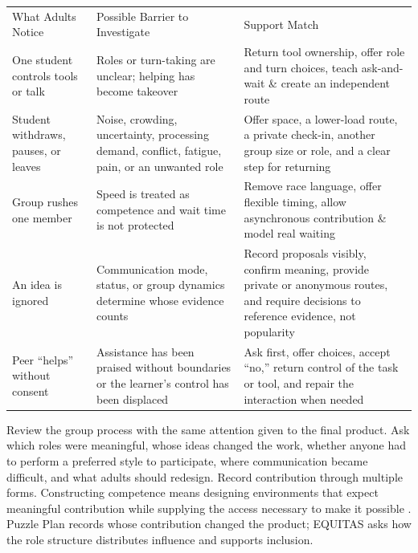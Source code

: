 \begin{tabularx}{\textwidth}{
>{\RaggedRight\arraybackslash}p{1.35in}
>{\RaggedRight\arraybackslash}p{2.25in}
>{\RaggedRight\arraybackslash}X}

\rowcolor{PrimaryRed}
\color{white}What Adults Notice &
\color{white}Possible Barrier to Investigate &
\color{white}Support Match \\

One student controls tools or talk &
Roles or turn-taking are unclear; helping has become takeover &
Return tool ownership, offer role and turn choices, teach ask-and-wait \& create an independent route \\

\rowcolor{SoftGray}
Student withdraws, pauses, or leaves &
Noise, crowding, uncertainty, processing demand, conflict, fatigue, pain, or an unwanted role &
Offer space, a lower-load route, a private check-in, another group size or role, and a clear step for returning \\

Group rushes one member &
Speed is treated as competence and wait time is not protected &
Remove race language, offer flexible timing, allow asynchronous contribution \& model real waiting \\

\rowcolor{SoftGray}
An idea is ignored &
Communication mode, status, or group dynamics determine whose evidence counts &
Record proposals visibly, confirm meaning, provide private or anonymous routes, and require decisions to reference evidence, not popularity \\

Peer ``helps'' without consent &
Assistance has been praised without boundaries or the learner's control has been displaced &
Ask first, offer choices, accept ``no,'' return control of the task or tool, and repair the interaction when needed \\

\end{tabularx}

\normalsize
{}

Review the group process with the same attention given to the final product. Ask which roles were meaningful, whose ideas changed the work, whether anyone had to perform a preferred style to participate, where communication became difficult, and what adults should redesign. Record contribution through multiple forms. Constructing competence means designing environments that expect meaningful contribution while supplying the access necessary to make it possible \citep{jorgensen2018competence}. Puzzle Plan records whose contribution changed the product; EQUITAS asks how the role structure distributes influence and supports inclusion.

